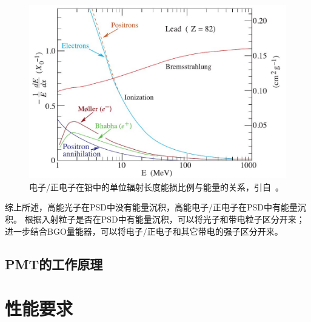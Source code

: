 \begin{figure}[h!]
\centering
\includegraphics[width=0.8\linewidth]{chap/description/fig/electron_energyloss}
\caption{电子/正电子在铅中的单位辐射长度能损比例与能量的关系，引自~\parencite{pdg_book}。}
\label{fig:ch2:electron_energyloss}
\end{figure}

综上所述，高能光子在PSD中没有能量沉积，高能电子/正电子在PSD中有能量沉积。
根据入射粒子是否在PSD中有能量沉积，可以将光子和带电粒子区分开来；进一步结合BGO量能器，可以将电子/正电子和其它带电的强子区分开来。

\subsection{PMT的工作原理}


\section{性能要求}
\label{sec:psd_requirements}

